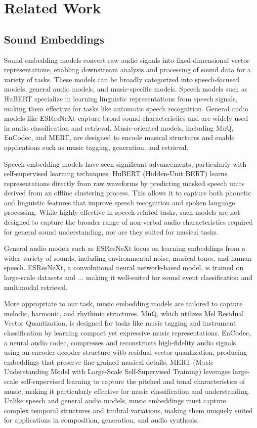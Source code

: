 \documentclass[twoside,a4paper]{article}
\begin{document}
\section{Related Work}

\subsection{Sound Embeddings}
Sound embedding models convert raw audio signals into fixed-dimensional vector representations, enabling downstream analysis and processing of sound data for a variety of tasks. These models can be broadly categorized into speech-focused models, general audio models, and music-specific models. Speech models such as HuBERT specialize in learning linguistic representations from speech signals, making them effective for tasks like automatic speech recognition. General audio models like ESResNeXt capture broad sound characteristics and are widely used in audio classification and retrieval. Music-oriented models, including MuQ, EnCodec, and MERT, are designed to encode musical structures and enable applications such as music tagging, generation, and retrieval.

Speech embedding models have seen significant advancements, particularly with self-supervised learning techniques. HuBERT (Hidden-Unit BERT) learns representations directly from raw waveforms by predicting masked speech units derived from an offline clustering process. This allows it to capture both phonetic and linguistic features that improve speech recognition and spoken language processing. While highly effective in speech-related tasks, such models are not designed to capture the broader range of non-verbal audio characteristics required for general sound understanding, nor are they suited for musical tasks.

General audio models such as ESResNeXt focus on learning embeddings from a wider variety of sounds, including environmental noise, musical tones, and human speech. ESResNeXt, a convolutional neural network-based model, is trained on large-scale datasets and ... making it well-suited for sound event classification and multimodal retrieval.

More appropriate to our task, music embedding models are tailored to capture melodic, harmonic, and rhythmic structures. MuQ, which utilizes Mel Residual Vector Quantization, is designed for tasks like music tagging and instrument classification by learning compact yet expressive music representations. EnCodec, a neural audio codec, compresses and reconstructs high-fidelity audio signals using an encoder-decoder structure witb residual vector quantization, producing embeddings that preserve fine-grained musical details. MERT (Music Understanding Model with Large-Scale Self-Supervised Training) leverages large-scale self-supervised learning to capture the pitched and tonal characteristics of music, making it particularly effective for music classification and understanding. Unlike speech and general audio models, music embeddings must capture complex temporal structures and timbral variations, making them uniquely suited for applications in composition, generation, and audio synthesis.
\end{document}
